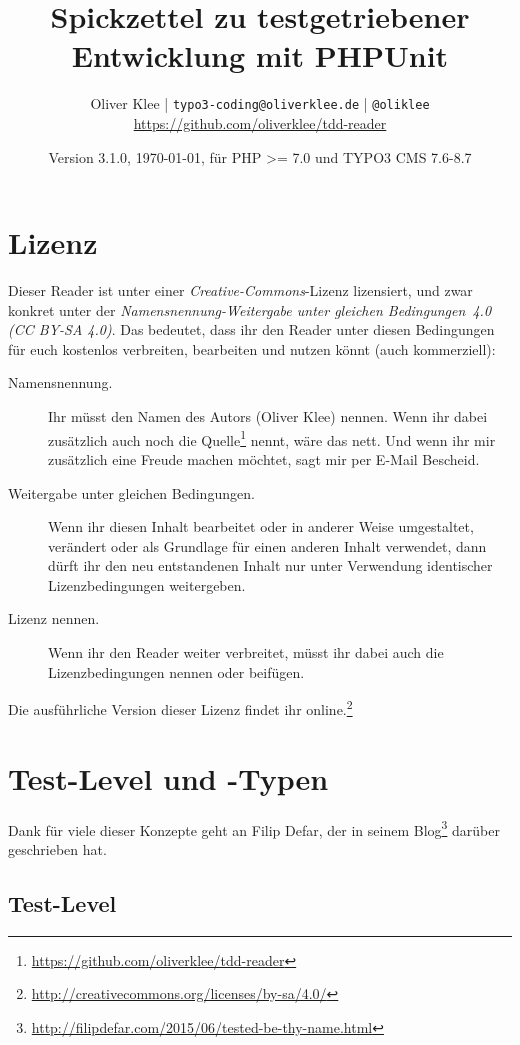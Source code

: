 \documentclass[a4paper,11pt,headsepline]{scrartcl}
\author{
  Oliver Klee | \texttt{typo3-coding@oliverklee.de} | \texttt{@oliklee} \\
  \url{https://github.com/oliverklee/tdd-reader}
}
\date{Version 3.1.0, \today, für PHP >= 7.0 und TYPO3 CMS 7.6-8.7}
\title{
  Spickzettel zu testgetriebener Entwicklung mit PHPUnit
}
\begin{document}
\nocite*{}

\maketitle

\section*{Lizenz}

Dieser Reader ist unter einer \emph{Creative-Commons}-Lizenz lizensiert, und zwar konkret unter der \emph{Namensnennung-Weitergabe unter gleichen Bedingungen~4.0 (CC BY-SA 4.0)}. Das bedeutet, dass ihr den Reader unter diesen Bedingungen für euch kostenlos verbreiten, bearbeiten und nutzen könnt (auch kommerziell):

\begin{description}
  \item[Namensnennung.] Ihr müsst den Namen des Autors (Oliver Klee) nennen. Wenn ihr dabei zusätzlich auch noch die Quelle\footnote{\url{https://github.com/oliverklee/tdd-reader}} nennt, wäre das nett. Und wenn ihr mir zusätzlich eine Freude machen möchtet, sagt mir per E-Mail Bescheid.
  \item[Weitergabe unter gleichen Bedingungen.] Wenn ihr diesen Inhalt bearbeitet oder in anderer Weise umgestaltet, verändert oder als Grundlage für einen anderen Inhalt verwendet, dann dürft ihr den neu entstandenen Inhalt nur unter Verwendung identischer Lizenzbedingungen weitergeben.
  \item[Lizenz nennen.] Wenn ihr den Reader weiter verbreitet, müsst ihr dabei auch die Lizenzbedingungen nennen oder beifügen.
\end{description}

Die ausführliche Version dieser Lizenz findet ihr online.\footnote{\url{http://creativecommons.org/licenses/by-sa/4.0/}}


\pagebreak
\tableofcontents

\pagebreak
\section{Test-Level und -Typen}

Dank für viele dieser Konzepte geht an Filip Defar, der in seinem Blog\footnote{\url{http://filipdefar.com/2015/06/tested-be-thy-name.html}} darüber geschrieben hat.


\subsection{Test-Level}
\end{document}
